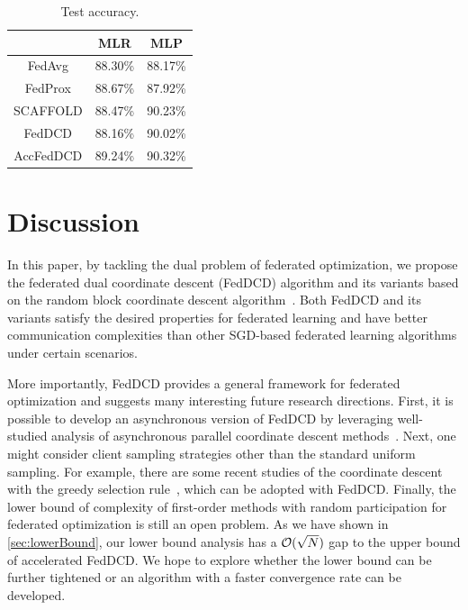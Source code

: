 \begin{table}[t]
    \centering
    \begin{tabular}{ccc}
    \toprule
                    &  MLR      & MLP \\ \hline
        FedAvg      &  88.30\%  & 88.17\% \\
        FedProx     &  88.67\%  & 87.92\% \\ 
        SCAFFOLD    &  88.47\%  & 90.23\% \\
        FedDCD      &  88.16\%  & 90.02\% \\
        AccFedDCD   &  89.24\%  & 90.32\% \\
    \bottomrule
    \end{tabular}
    \caption{Test accuracy.}
    \label{tab:exp3}
\end{table}

\section{Discussion}

In this paper, by tackling the dual problem of federated optimization, we propose the federated dual coordinate descent (FedDCD) algorithm and its variants based on the random block coordinate descent algorithm~\citep{necoara2017random}. Both FedDCD and its variants satisfy the desired properties for federated learning and have better communication complexities than other SGD-based federated learning algorithms under certain scenarios. 

More importantly, FedDCD provides a general framework for federated optimization and suggests many interesting future research directions. First, it is possible to develop an asynchronous version of FedDCD by leveraging well-studied analysis of asynchronous parallel coordinate descent methods~\citep{LiuW15,0002WRBS15}. Next, one might consider client sampling strategies other than the standard uniform sampling. For example, there are some recent studies of the coordinate descent with the greedy selection rule~\citep{NutiniSLFK15,BCD_julie,fang2020greed}, which can be adopted with FedDCD. Finally, the lower bound of complexity of first-order methods with random participation for federated optimization is still an open problem. As we have shown in \autoref{sec:lowerBound}, our lower bound analysis has a $\mathcal{O}(\sqrt{N})$ gap to the upper bound of accelerated FedDCD. We hope to explore whether the lower bound can be further tightened or an algorithm with a faster convergence rate can be developed. 


